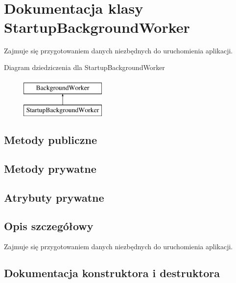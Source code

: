 \hypertarget{a00060}{}\section{Dokumentacja klasy Startup\+Background\+Worker}
\label{a00060}


Zajmuje się przygotowaniem danych niezbędnych do uruchomienia aplikacji.  


Diagram dziedziczenia dla Startup\+Background\+Worker\begin{figure}[H]
\begin{center}
\leavevmode
\includegraphics[height=2.000000cm]{d9/d73/a00060}
\end{center}
\end{figure}
\subsection*{Metody publiczne}
\subsection*{Metody prywatne}
\subsection*{Atrybuty prywatne}


\subsection{Opis szczegółowy}
Zajmuje się przygotowaniem danych niezbędnych do uruchomienia aplikacji. 



\subsection{Dokumentacja konstruktora i destruktora}
\hypertarget{a00060_a65e018a132cf991786690cb73e301736}{}
